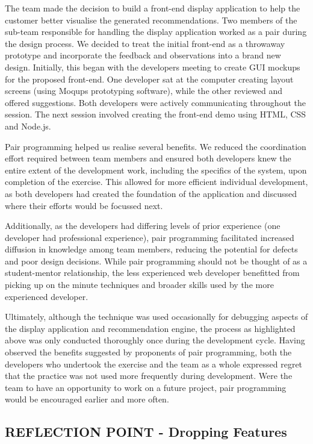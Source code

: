 \documentclass{l3proj}
\begin{document}
The team made the decision to build a front-end display application to help the customer better visualise the generated recommendations. Two members of the sub-team responsible for handling the display application worked as a pair during the design process. We decided to treat the initial front-end as a throwaway prototype and incorporate the feedback and observations into a brand new design. Initially, this began with the developers meeting to create GUI mockups for the proposed front-end. One developer sat at the computer creating layout screens (using Moqups prototyping software), while the other reviewed and offered suggestions. Both developers were actively communicating throughout the session. The next session involved creating the front-end demo using HTML, CSS and Node.js.

Pair programming helped us realise several benefits. We reduced the coordination effort required between team members and ensured both developers knew the entire extent of the development work, including the specifics of the system, upon completion of the exercise. This allowed for more efficient individual development, as both developers had created the foundation of the application and discussed where their efforts would be focussed next.

Additionally, as the developers had differing levels of prior experience (one developer had professional experience), pair programming facilitated increased diffusion in knowledge among team members, reducing the potential for defects and poor design decisions. While pair programming should not be thought of as a student-mentor relationship, the less experienced web developer benefitted from picking up on the minute techniques and broader skills used by the more experienced developer.

Ultimately, although the technique was used occasionally for debugging aspects of the display application and recommendation engine, the process as highlighted above was only conducted thoroughly once during the development cycle. Having observed the benefits suggested by proponents of pair programming, both the developers who undertook the exercise and the team as a whole expressed regret that the practice was not used more frequently during development. Were the team to have an opportunity to work on a future project, pair programming would be encouraged earlier and more often.

\subsection{REFLECTION POINT - Dropping Features}
\label{sec:droppingreflection}
\end{document}
